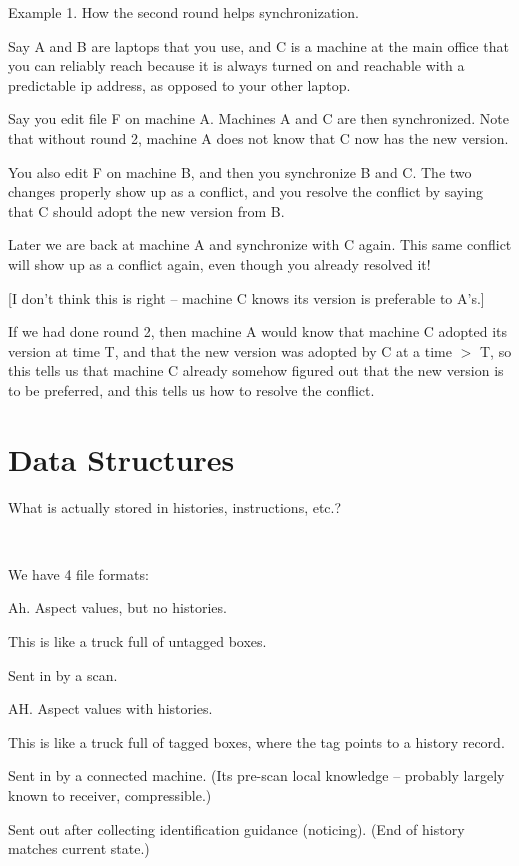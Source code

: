 \documentclass{book}
\begin{document}
Example 1.  How the second round helps synchronization.

Say A and B are laptops that you use, and C is a machine at the main office that you can reliably reach because it is always turned on and reachable with a predictable ip address, as opposed to your other laptop.

Say you edit file F on machine A.  Machines A and C are then synchronized.  Note that without round 2, machine A does not know that C now has the new version.

You also edit F on machine B, and then you synchronize B and C.  The two changes properly show up as a conflict, and you resolve the conflict by saying that C should adopt the new version from B.

Later we are back at machine A and synchronize with C again.  This same conflict will show up as a conflict again, even though you already resolved it!

[I don't think this is right -- machine C knows its version is preferable to A's.]

If we had done round 2, then machine A would know that machine C adopted its version at time T, and that the new version was adopted by C at a time $>$ T, so this tells us that machine C already somehow figured out that the new version is to be preferred, and this tells us how to resolve the conflict.




\section{Data Structures}

What is actually stored in histories, instructions, etc.?

~

We have 4 file formats:

Ah. Aspect values, but no histories.

		This is like a truck full of untagged boxes.

	Sent in by a scan.

AH. Aspect values with histories.

		This is like a truck full of tagged boxes, where the tag points to a history record.

	Sent in by a connected machine.  (Its pre-scan local knowledge -- probably largely known to receiver, compressible.)

	Sent out after collecting identification guidance (noticing).  (End of history matches current state.)
\end{document}
